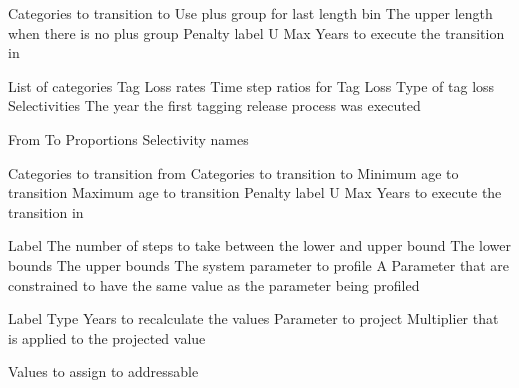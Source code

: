  {Categories to transition to}
 {Use plus group for last length bin}
 {The upper length when there is no plus group}
 {Penalty label}
 {U Max}
 {Years to execute the transition in}
 {}
 {}
 {}
 {}
\par\textbf{}\par
{} {List of categories}
 {Tag Loss rates}
 {Time step ratios for Tag Loss}
 {Type of tag loss}
 {Selectivities}
 {The year the first tagging release process was executed}
\par\textbf{}\par
{} {From}
 {To}
 {Proportions}
 {Selectivity names}
\par\textbf{}\par
{} {Categories to transition from}
 {Categories to transition to}
 {Minimum age to transition}
 {Maximum age to transition}
 {Penalty label}
 {U Max}
 {Years to execute the transition in}
\par\par
{} {Label}
 {The number of steps to take between the lower and upper bound}
 {The lower bounds}
 {The upper bounds}
 {The system parameter to profile}
 {A Parameter that are constrained to have the same value as the parameter being profiled}
\par\par
{} {Label}
 {Type}
 {Years to recalculate the values}
 {Parameter to project}
 {Multiplier that is applied to the projected value}
\par\textbf{}\par
{} {Values to assign to addressable}
\par\textbf{}\par
